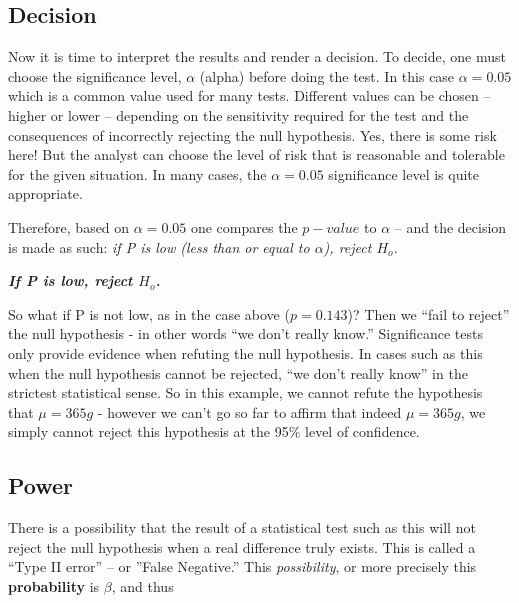 \subsection{Decision}
Now it is time to interpret the results and render a decision.  To decide, one must choose the significance level, $\alpha$ (alpha) before doing the test.  In this case $\alpha = 0.05$ which is a common value used for many tests.  Different values can be chosen -- higher or lower -- depending on the sensitivity required for the test and the consequences of incorrectly rejecting the null hypothesis.  Yes, there is some risk here!  But the analyst can choose the level of risk that is reasonable and tolerable for the given situation.  In many cases, the $\alpha = 0.05$ significance level is quite appropriate.

Therefore, based on $\alpha = 0.05$ one compares the $p-value$ to $\alpha$ -- and the decision is made as such: \textit{if P is low (less than or equal to $\alpha$), reject $H_{o}$.}

\begin{center}
 \textbf{\textit{If P is low, reject $H_{o}$.}}
\end{center}
So what if P is not low, as in the case above ($p = 0.143$)?  Then we ``fail to reject'' the null hypothesis - in other words ``we don't really know.''  Significance tests only provide evidence when refuting the null hypothesis.  In cases such as this when the null hypothesis cannot be rejected, ``we don't really know'' in the strictest statistical sense. So in this example, we cannot refute the hypothesis that  $ \mu = 365 g $ - however we can't go so far to affirm that indeed  $ \mu = 365 g $, we simply cannot reject this hypothesis at the 95\% level of confidence.\\

\subsection{Power}
There is a possibility that the result of a statistical test such as this will not reject the null hypothesis when a real difference truly exists.  This is called a ``Type II error'' -- or ''False Negative.''  This \textit{possibility}, or more precisely this \textbf{probability} is $ \beta $, and thus

